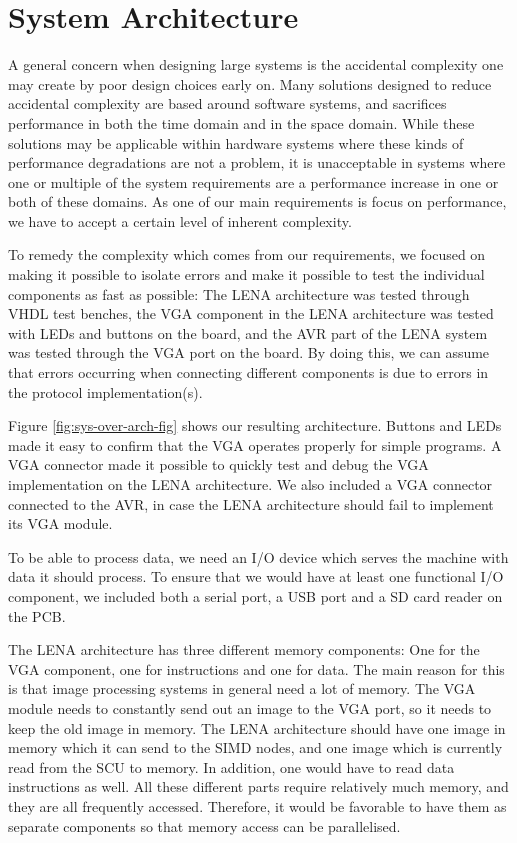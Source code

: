 \section{System Architecture}

A general concern when designing large systems is the accidental
complexity\cite[p.~8-9]{holt2004uml} one may create by poor design choices early
on. Many solutions designed to reduce accidental complexity are based around
software systems, and sacrifices performance in both the time domain and in the
space domain\cite{moseley2006out}. While these solutions may be applicable
within hardware systems where these kinds of performance degradations are not a
problem, it is unacceptable in systems where one or multiple of the system
requirements are a performance increase in one or both of these domains. As one
of our main requirements is focus on performance, we have to accept a certain
level of inherent complexity.


To remedy the complexity which comes from our requirements, we focused on making
it possible to isolate errors and make it possible to test the individual
components as fast as possible: The \ac{LENA} architecture was tested through
\ac{VHDL} test benches, the \ac{VGA} component in the \ac{LENA} architecture was
tested with \acp{LED} and buttons on the board, and the AVR part of the
\ac{LENA} system was tested through the \ac{VGA} port on the board. By doing
this, we can assume that errors occurring when connecting different components is
due to errors in the protocol implementation(s).

Figure \ref{fig:sys-over-arch-fig} shows our resulting architecture. Buttons and
\acp{LED} made it easy to confirm that the \ac{VGA} operates properly for simple
programs. A \ac{VGA} connector made it possible to quickly test and debug the
\ac{VGA} implementation on the \ac{LENA} architecture. We also included a
\ac{VGA} connector connected to the AVR, in case the \ac{LENA} architecture
should fail to implement its \ac{VGA} module.

To be able to process data, we need an \ac{I/O} device which serves the machine
with data it should process. To ensure that we would have at least one
functional \ac{I/O} component, we included both a serial
port, a \ac{USB} port and a \ac{SD} card reader on the \ac{PCB}.

The \ac{LENA} architecture has three different memory components: One for the
\ac{VGA} component, one for instructions and one for data. The main reason for
this is that image processing systems in general need a lot of memory. The
\ac{VGA} module needs to constantly send out an image to the \ac{VGA} port, so
it needs to keep the old image in memory. The \ac{LENA} architecture should have
one image in memory which it can send to the \ac{SIMD} nodes, and one image
which is currently read from the \ac{SCU} to memory. In addition, one would have
to read data instructions as well. All these different parts require relatively
much memory, and they are all frequently accessed. Therefore, it would be
favorable to have them as separate components so that memory access can be
parallelised.
